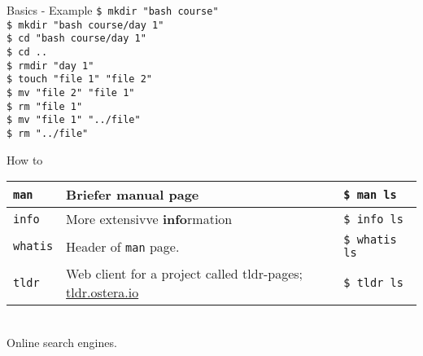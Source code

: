 \documentclass{beamer}
\let\tt\texttt
\let\bf\textbf
\begin{document}
\begin{frame}{Basics - Example}
        \tt{\$ mkdir "bash course"}         \\
        \tt{\$ mkdir "bash course/day 1"}   \\
        \tt{\$ cd "bash course/day 1"}      \\
        \tt{\$ cd ..}                       \\
        \tt{\$ rmdir "day 1"}               \\
        \tt{\$ touch "file 1" "file 2"}     \\
        \tt{\$ mv "file 2" "file 1"}        \\
        \tt{\$ rm "file 1"}                 \\
        \tt{\$ mv "file 1" "../file"}       \\
        \tt{\$ rm "../file"}                \\
\end{frame}

\begin{frame}{How to}
        \begin{tabular}{p{} p{} | p{}}
                \hline
                \tt{man}                    &
                Briefer \bf{man}ual page    &
                \tt{\$ man ls}              \\
                \hline
                \tt{info}                           &
                More extensivve \bf{info}rmation    &
                \tt{\$ info ls}                     \\
                \hline
                \tt{whatis}                         &
                Header of \tt{man} page.            &
                \tt{\$ whatis ls}                   \\
                \hline
                \tt{tldr}             &
                Web client for a project called tldr-pages; 
                \url{tldr.ostera.io} &
                \tt{\$ tldr ls}       \\
                \hline
        \end{tabular}   \\
        Online search engines.
\end{frame}
\end{document}
